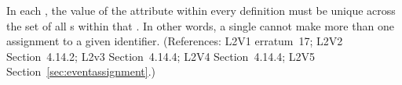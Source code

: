 In each \Event, the value of the  attribute
within every \EventAssignment definition must be unique across the set of
all \EventAssignment{}s within that \Event.  In other words, a
single \Event cannot make more than one assignment to a given
identifier.  (References: L2V1 erratum~17; L2V2 Section~4.14.2;
L2v3 Section~4.14.4; L2V4 Section~4.14.4; L2V5 Section~\ref{sec:eventassignment}.)
